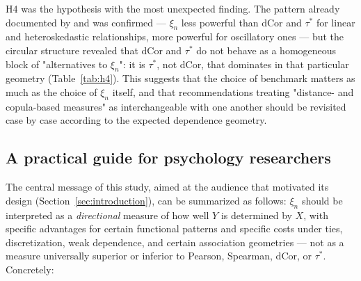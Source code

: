 \documentclass[article]{ajs}
\begin{document}
H4 was the hypothesis with the most unexpected finding. The pattern
already documented by \citet{chatterjee2021} and \citet{gao2024} was
confirmed --- $\xi_n$ less powerful than dCor and $\tau^\ast$ for
linear and heteroskedastic relationships, more powerful for
oscillatory ones --- but the circular structure revealed that dCor and
$\tau^\ast$ do not behave as a homogeneous block of "alternatives to
$\xi_n$": it is $\tau^\ast$, not dCor, that dominates in that
particular geometry (Table~\ref{tab:h4}). This suggests that the
choice of benchmark matters as much as the choice of $\xi_n$ itself,
and that recommendations treating "distance- and copula-based
measures" as interchangeable with one another should be revisited case
by case according to the expected dependence geometry.

\subsection{A practical guide for psychology researchers}

The central message of this study, aimed at the audience that
motivated its design (Section~\ref{sec:introduction}), can be
summarized as follows: $\xi_n$ should be interpreted as a
\emph{directional} measure of how well $Y$ is determined by $X$, with
specific advantages for certain functional patterns and specific costs
under ties, discretization, weak dependence, and certain association
geometries --- not as a measure universally superior or inferior to
Pearson, Spearman, dCor, or $\tau^\ast$. Concretely:
\end{document}
